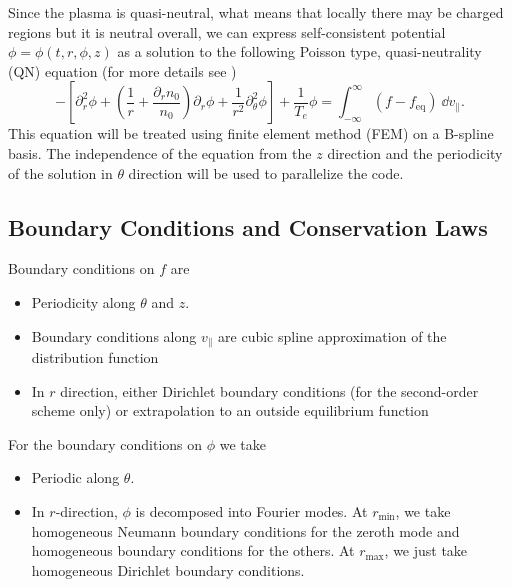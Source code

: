 Since the plasma is quasi-neutral, what means that locally there may be charged regions but it is neutral overall, we can express self-consistent potential $\phi = \phi(t, r, \phi, z)$ as a solution to the following Poisson type, quasi-neutrality (QN) equation (for more details see \cite{emily})
\begin{equation}
- \left[\partial_r^2 \phi + \left( \frac{1}{r} + \frac{\partial_r n_0}{n_0}\right)\partial_r \phi + \frac{1}{r^2} \partial_\theta^2 \phi \right] + \frac{1}{T_e} \phi = \int_{-\infty}^{\infty} (f - f_\text{eq}) \ \dd v_\parallel. \label{eq:qn}
\end{equation}
This equation will be treated using finite element method (FEM) on a B-spline basis. The independence of the equation from the $z$ direction and the periodicity of the solution in $\theta$ direction will be used to parallelize the code.

\subsection{Boundary Conditions and Conservation Laws}

Boundary conditions on $f$ are
\begin{itemize}
    \item Periodicity along $\theta$ and $z$.
    \item Boundary conditions along $v_\parallel$ are cubic spline approximation of the distribution function %
    \item In $r$ direction, either Dirichlet boundary conditions (for the second-order scheme only) or extrapolation to an outside equilibrium function
\end{itemize}

For the boundary conditions on $\phi$ we take
\begin{itemize}
    \item Periodic along $\theta$.
    \item In $r$-direction, $\phi$ is decomposed into Fourier modes. At $r_\text{min}$, we take homogeneous Neumann boundary conditions for the zeroth mode and homogeneous boundary conditions for the others. At $r_\text{max}$, we just take homogeneous Dirichlet boundary conditions.
\end{itemize}

